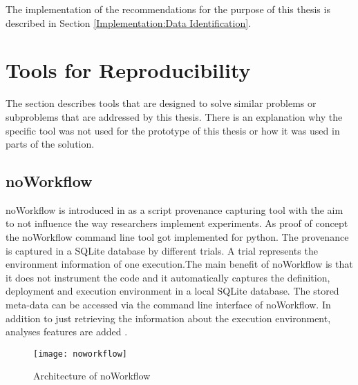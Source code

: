 \documentclass[draft,final]{vutinfth} %
\begin{document}
The implementation of the recommendations for the purpose of this thesis is described in Section \ref{Implementation:Data Identification}. 
\section{Tools for Reproducibility}\label{Existing Tools}
The section describes tools that are designed to solve similar problems or subproblems that are addressed by this thesis. There is an explanation why the specific tool was not used for the prototype of this thesis or how it was used in parts of the solution. 

\subsection{noWorkflow}\label{Noworkflow}
noWorkflow is introduced in \cite{c9e0604becba42af96a9cb0a6f60018b} as a script provenance capturing tool with the aim to not influence the way researchers implement experiments. As proof of concept the noWorkflow command line tool got implemented for python. The provenance is captured in a SQLite database by different trials. A trial represents the environment information of one execution.The main benefit of noWorkflow is that it does not instrument the code and it automatically captures the definition, deployment and execution environment in a local SQLite database. The stored meta-data can be accessed via the command line interface of noWorkflow. In addition to just retrieving the information about the execution environment, analyses features are added \cite{c9e0604becba42af96a9cb0a6f60018b}.

\begin{figure}[h]
	\centering
	\texttt{[image: noworkflow]}
	\caption{Architecture of noWorkflow \cite{c9e0604becba42af96a9cb0a6f60018b}}
	\label{fig:noworkflow} %
\end{figure}
\end{document}
